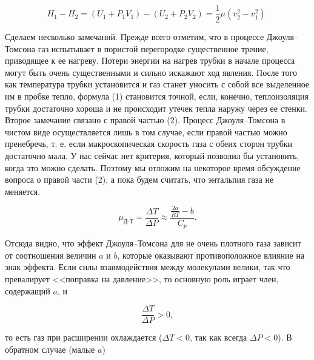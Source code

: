 \documentclass[a4paper, 12pt]{article}%
\begin{document}
	\begin{equation}
		H_1 - H_2 = (U_1 + P_1V_1) - (U_2 + P_2V_2) = \dfrac{1}{2} \mu (v_2^2 - v_1^2).
	\end{equation}
	
	Сделаем несколько замечаний. Прежде всего отметим, что в процессе Джоуля–Томсона газ испытывает в пористой перегородке существенное трение, приводящее к ее нагреву. Потери энергии на нагрев трубки в начале процесса могут быть очень существенными и сильно искажают ход явления. После того как температура трубки установится и газ станет уносить с собой все выделенное им в пробке тепло, формула (1) становится точной, если, конечно, теплоизоляция трубки достаточно хороша и не происходит утечек тепла наружу через ее стенки.\\
	
	Второе замечание связано с правой частью (2). Процесс Джоуля–Томсона в чистом виде осуществляется лишь в том случае, если правой частью можно пренебречь, т. е. если макроскопическая скорость газа с обеих сторон трубки достаточно мала. У нас сейчас нет критерия, который позволил бы установить, когда это можно сделать. Поэтому мы отложим на некоторое время обсуждение вопроса о правой части (2), а пока будем считать, что энтальпия газа не меняется.
	
	\begin{equation}
		\mu_{\text{Д-Т}} = \dfrac{\Delta T}{\Delta P} \approx \dfrac{\frac{2a}{RT}-b}{C_p}.
	\end{equation}
	
	Отсюда видно, что эффект Джоуля–Томсона для не очень плотного газа зависит от соотношения величин $a$ и $b$, которые оказывают противоположное влияние на знак эффекта. Если силы взаимодействия между молекулами велики, так что превалирует <<поправка на давление>>, то основную роль играет член, содержащий $a$, и
	
	\begin{equation}
		\dfrac{\Delta T}{\Delta P} > 0,
	\end{equation}
	
	то есть газ при расширении охлаждается ($\Delta T < 0$, так как всегда $\Delta P < 0$). В обратном случае (малые $a$)
	
\end{document}
